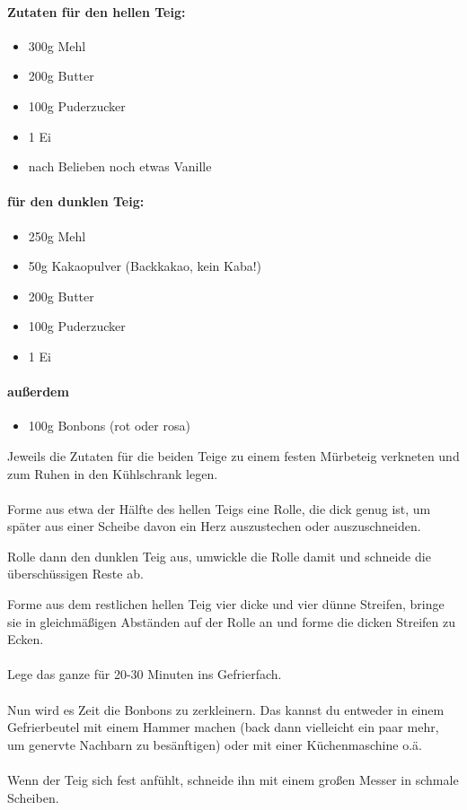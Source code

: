 {\paragraph{Zutaten für den hellen Teig:}
    \begin{itemize}
        \item 300g Mehl
        \item 200g Butter
        \item 100g Puderzucker
        \item 1 Ei
        \item nach Belieben noch etwas Vanille
    \end{itemize}
    \paragraph{für den dunklen Teig:}
    \begin{itemize}
        \item 250g Mehl
        \item 50g Kakaopulver (Backkakao, kein Kaba!)
        \item 200g Butter
        \item 100g Puderzucker
        \item 1 Ei
    \end{itemize}
    \paragraph{außerdem}
    \begin{itemize}
        \item 100g Bonbons (rot oder rosa)
    \end{itemize}
    \vspace*{\fill}
    \columnbreak
    Jeweils die Zutaten für die beiden Teige zu einem festen Mürbeteig verkneten
    und zum Ruhen in den Kühlschrank legen.
    \\~\\
    Forme aus etwa der Hälfte des hellen Teigs eine Rolle, die dick genug ist, um
    später aus einer Scheibe davon ein Herz auszustechen oder auszuschneiden.

    Rolle dann den dunklen Teig aus, umwickle die Rolle damit und schneide die
    überschüssigen Reste ab.

    Forme aus dem restlichen hellen Teig vier dicke und
    vier dünne Streifen, bringe sie in gleichmäßigen Abständen auf der Rolle an und
    forme die dicken Streifen zu Ecken.
    \\~\\
    Lege das ganze für 20-30 Minuten ins Gefrierfach.
    \\~\\
    Nun wird es Zeit die Bonbons zu zerkleinern. Das kannst du entweder in einem
    Gefrierbeutel mit einem Hammer machen (back dann vielleicht ein paar mehr, um
    genervte Nachbarn zu besänftigen) oder mit einer Küchenmaschine o.ä.
    \\~\\
    Wenn der Teig sich fest anfühlt, schneide ihn mit einem großen Messer in
    schmale Scheiben.

}
